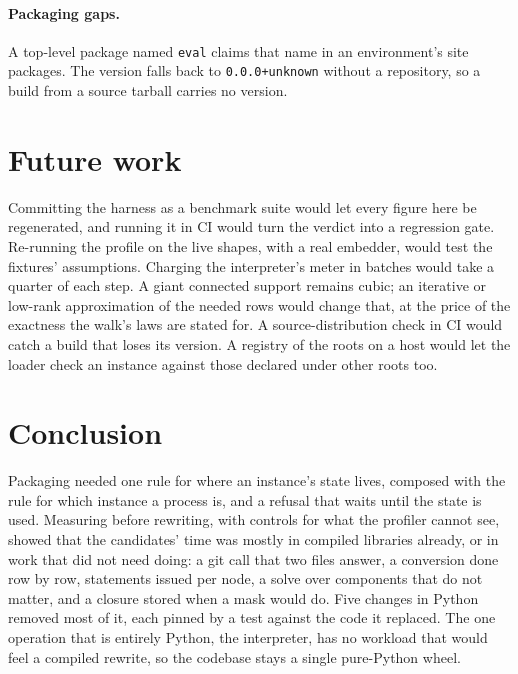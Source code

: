 \documentclass[11pt]{article}
\theoremstyle{plain}
\theoremstyle{definition}
\theoremstyle{remark}
\begin{document}
\paragraph{Packaging gaps.} A top-level package named \texttt{eval} claims that name in an
environment's site packages. The version falls back to \texttt{0.0.0+unknown} without a repository,
so a build from a source tarball carries no version.

\section{Future work}
Committing the harness as a benchmark suite would let every figure here be regenerated, and running
it in CI would turn the verdict into a regression gate. Re-running the profile on the live shapes,
with a real embedder, would test the fixtures' assumptions. Charging the interpreter's meter in
batches would take a quarter of each step. A giant connected support remains cubic; an iterative or
low-rank approximation of the needed rows would change that, at the price of the exactness the walk's
laws are stated for. A source-distribution check in CI would catch a build that loses its version.
A registry of the roots on a host would let the loader check an instance against those declared
under other roots too.

\section{Conclusion}
Packaging needed one rule for where an instance's state lives, composed with the rule for which
instance a process is, and a refusal that waits until the state is used. Measuring before rewriting, with controls for what the profiler cannot see, showed
that the candidates' time was mostly in compiled libraries already, or in work that did not need
doing: a git call that two files answer, a conversion done row by row, statements issued per node, a
solve over components that do not matter, and a closure stored when a mask would do. Five changes in
Python removed most of it, each pinned by a test against the code it replaced. The one operation that
is entirely Python, the interpreter, has no workload that would feel a compiled rewrite, so the
codebase stays a single pure-Python wheel.



\end{document}
